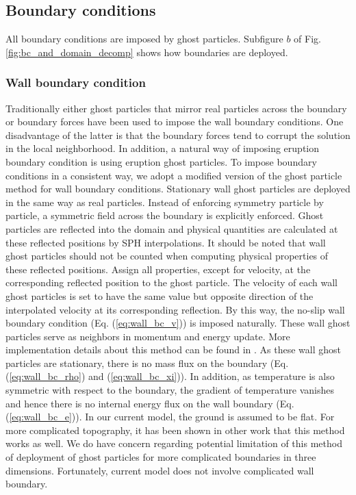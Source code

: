 \documentclass[gmd, manuscript]{copernicus}
\begin{document}
\subsection{Boundary conditions}
All boundary conditions are imposed by ghost particles. Subfigure $b$ of Fig. \ref{fig:bc_and_domain_decomp} shows how boundaries are deployed.
\subsubsection{Wall boundary condition}
Traditionally either ghost particles that mirror real particles across the boundary \citep {ferrari2009new} or boundary forces \citep {monaghan2009sph} have been used to impose the wall boundary conditions. One disadvantage of the latter  is that the boundary forces tend to corrupt the solution in the local neighborhood. In addition, a natural way of imposing eruption boundary condition is using eruption ghost particles. To impose boundary conditions in a consistent way, we adopt a modified version of the ghost particle method \citep {kumar2013parallel} for wall boundary conditions. Stationary wall ghost particles are deployed in the same way as real particles. Instead of enforcing symmetry particle by particle, a symmetric field across the boundary is explicitly enforced. Ghost particles are reflected into the domain and physical quantities are calculated at these reflected positions by SPH interpolations. It should be noted that wall ghost particles should not be counted when computing physical properties of these reflected positions. Assign all properties, except for velocity, at the corresponding reflected position to the ghost particle. The velocity of each wall ghost particles is set to have the same value but opposite direction of the interpolated velocity at its corresponding reflection. By this way, the no-slip wall boundary condition (Eq. (\ref{eq:wall_bc_v})) is imposed naturally. These wall ghost particles serve as neighbors in momentum and energy update. More implementation details about this method can be found in \citep {kumar2013parallel}. As these wall ghost particles are stationary, there is no mass flux on the boundary (Eq. (\ref{eq:wall_bc_rho}) and (\ref{eq:wall_bc_xi})). In addition, as temperature is also symmetric with respect to the boundary, the gradient of temperature vanishes and hence there is no internal energy flux on the wall boundary (Eq. (\ref{eq:wall_bc_e})). 
In our current model, the ground is assumed to be  flat. For more complicated topography, it has been shown in other work \citep {kumar2013parallel} that this method works as well. We do have concern regarding potential limitation of this method of deployment of ghost particles for more complicated boundaries in three dimensions. Fortunately, current model does not involve complicated wall boundary.
\end{document}
